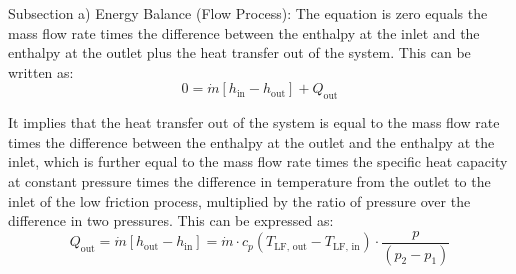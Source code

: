 Subsection a) Energy Balance (Flow Process):
The equation is zero equals the mass flow rate times the difference between the enthalpy at the inlet and the enthalpy at the outlet plus the heat transfer out of the system. This can be written as:
\[ 0 = \dot{m} [ h_{\text{in}} - h_{\text{out}} ] + Q_{\text{out}} \]

It implies that the heat transfer out of the system is equal to the mass flow rate times the difference between the enthalpy at the outlet and the enthalpy at the inlet, which is further equal to the mass flow rate times the specific heat capacity at constant pressure times the difference in temperature from the outlet to the inlet of the low friction process, multiplied by the ratio of pressure over the difference in two pressures. This can be expressed as:
\[ Q_{\text{out}} = \dot{m} [ h_{\text{out}} - h_{\text{in}} ] = \dot{m} \cdot c_p ( T_{\text{LF, out}} - T_{\text{LF, in}} ) \cdot \frac{p}{( p_2 - p_1 )} \]